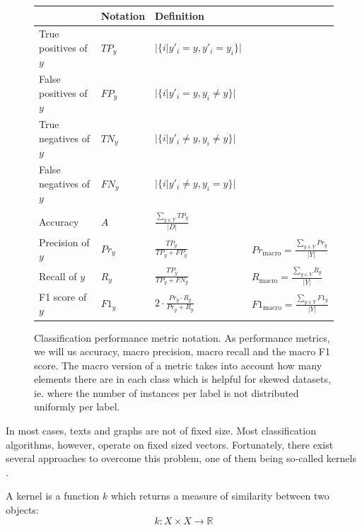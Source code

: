 \begin{figure}[htb!]
	\centering
	\renewcommand*{\arraystretch}{1.7}
	\begin{tabular}{llll}
\toprule
		& Notation & Definition & \\
		\toprule
		True positives of $y$ &
		$TP_y$ &
		$\displaystyle |\{i | y'_i = y, y'_i = y_i \}|$ &
		\\
		False positives of $y$ &
		$FP_y$ &
		$\displaystyle |\{i | y'_i = y, y_i \neq y \}|$ &
		\\
		True negatives of $y$ &
		$TN_y$ &
		$\displaystyle |\{i | y'_i \neq y, y_i \neq y\}|$ &
		\\
		False negatives of $y$ &
		$FN_y$ &
		$\displaystyle |\{i | y'_i \neq y, y_i = y\}|$ &
		\\[1ex]
		\midrule{}%
		\\[-2ex]
		Accuracy &
		$A$ &
		$\displaystyle \frac{\sum\nolimits_{y \in Y} TP_y}{|D|}$ &
		\\[3ex]
		Precision of $y$ &
		$Pr_y$ &
		$\displaystyle \frac{TP_y}{TP_y + FP_y} $ &
		$Pr_{\text{macro}} = \displaystyle \frac{\sum\nolimits_{y \in Y} Pr_y}{|Y|}$
		\\[3ex]
		Recall of $y$ &
		$R_y$ &
		$\displaystyle \frac{TP_y}{TP_y + FN_y}$ &
		$R_{\text{macro}} = \displaystyle \frac{\sum\nolimits_{y \in Y} R_y}{|Y|}$
		\\[3ex]
		F1 score of $y$ &
		$F1_y$ &
		$\displaystyle 2 \cdot \frac{Pr_y \cdot R_y}{Pr_y + R_y}$ &
		$F1_{\text{macro}} = \displaystyle \frac{\sum\nolimits_{y \in Y} F1_y}{|Y|}$
		\\
	\end{tabular}
	\caption[Notation: Classification metrics]{Classification performance metric notation. As performance metrics, we will us accuracy, macro precision, macro recall and the macro F1 score. The macro version of a metric takes into account how many elements there are in each class which is helpful for skewed datasets, ie. where the number of instances per label is not distributed uniformly per label.}\label{fig:classification_metrics}
\end{figure}


In most cases, texts and graphs are not of fixed size.
Most classification algorithms, however, operate on fixed sized vectors.
Fortunately, there exist several approaches to overcome this problem, one of them being so-called kernels \cite{Kriege2012}\cite[p.~295]{Bishop2006}.

A kernel is a function $k$ which returns a measure of similarity between two objects:
\begin{equation*}
k: X \times X \rightarrow \mathbb{R}
\end{equation*}

